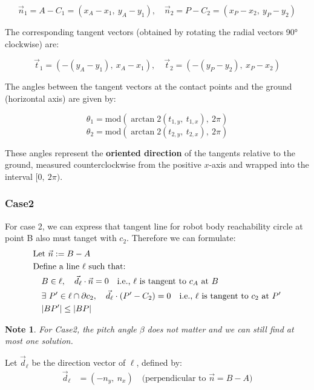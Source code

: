 \documentclass[11pt]{article}
\newtheorem{note}[statement]{Note}
\begin{document}
\[
\vec{n}_1 = A - C_1 = (x_A - x_1,\ y_A - y_1), \quad
\vec{n}_2 = P - C_2 = (x_P - x_2,\ y_P - y_2)
\]

The corresponding tangent vectors (obtained by rotating the radial vectors 90° clockwise) are:

\[
\vec{t}_1 = (-(y_A - y_1),\ x_A - x_1), \quad
\vec{t}_2 = (-(y_P - y_2),\ x_P - x_2)
\]

The angles between the tangent vectors at the contact points and the ground (horizontal axis) are given by:

\[
\theta_1 = \mathrm{mod}\left( \arctan2(t_{1,y},\ t_{1,x}),\ 2\pi \right)
\]
\[
\theta_2 = \mathrm{mod}\left( \arctan2(t_{2,y},\ t_{2,x}),\ 2\pi \right)
\]

These angles represent the \textbf{oriented direction} of the tangents relative to the ground, measured counterclockwise from the positive \(x\)-axis and wrapped into the interval \([0,\ 2\pi)\).



\subsubsection*{Case2}

\indent \indent For case 2, we can express that tangent line for robot body reachability circle
at point B also must tanget with \(c_2\). Therefore we can formulate:
\begin{align*}
    &\text{Let } \vec{n} := B - A \\
    &\text{Define a line } \ell \text{ such that:} \\
    &\quad B \in \ell,\quad \vec{d}_\ell \cdot \vec{n} = 0 \quad \text{i.e., }\ell \text{ is tangent to } c_A \text{ at } B \\
    &\quad \exists\ P' \in \ell \cap \partial c_2,\quad \vec{d}_\ell \cdot (P' - C_2) = 0 \quad \text{i.e., } \ell \text{ is tangent to } c_2 \text{ at } P'\\
    &\quad \abs{BP'} \leq \abs{BP}
\end{align*}

\begin{note}
    For Case2, the pitch angle \(\beta\) does not matter and we can still find at most one solution.
\end{note}

Let $\vec{d}_\ell$ be the direction vector of $\ell$, defined by:
\begin{align*}
    \vec{d}_\ell &= (-n_y,\ n_x) \quad \text{(perpendicular to } \vec{n} = B - A\text{)}
\end{align*}
\end{document}
